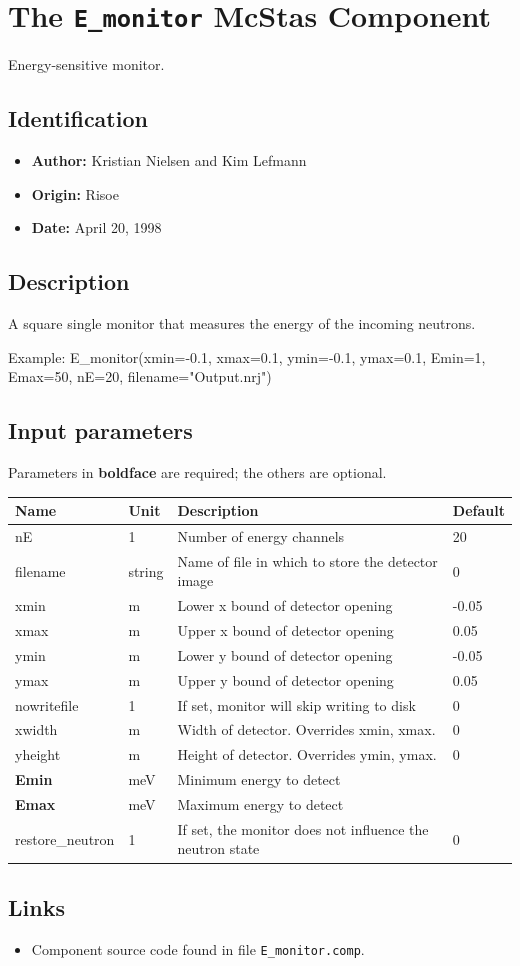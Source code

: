 \section{The \texttt{E\_monitor} McStas Component}
Energy-sensitive monitor.

\subsection*{Identification}
\begin{itemize}
  \item \textbf{Author:} Kristian Nielsen and Kim Lefmann
  \item \textbf{Origin:} Risoe
  \item \textbf{Date:} April 20, 1998
\end{itemize}

\subsection*{Description}
A square single monitor that measures the energy of the incoming neutrons.

Example: E\_monitor(xmin=-0.1, xmax=0.1, ymin=-0.1, ymax=0.1, Emin=1, Emax=50, nE=20, filename="Output.nrj")

\subsection*{Input parameters}
Parameters in \textbf{boldface} are required; the others are optional.

\begin{longtable}{p{}p{}p{}p{}}
\toprule
\textbf{Name} & \textbf{Unit} & \textbf{Description} & \textbf{Default} \\
\midrule
\endhead
nE & 1 & Number of energy channels & 20 \\
filename & string & Name of file in which to store the detector image & 0 \\
xmin & m & Lower x bound of detector opening & -0.05 \\
xmax & m & Upper x bound of detector opening & 0.05 \\
ymin & m & Lower y bound of detector opening & -0.05 \\
ymax & m & Upper y bound of detector opening & 0.05 \\
nowritefile & 1 & If set, monitor will skip writing to disk & 0 \\
xwidth & m & Width of detector. Overrides xmin, xmax. & 0 \\
yheight & m & Height of detector. Overrides ymin, ymax. & 0 \\
\textbf{Emin} & meV & Minimum energy to detect &  \\
\textbf{Emax} & meV & Maximum energy to detect &  \\
restore\_neutron & 1 & If set, the monitor does not influence the neutron state & 0 \\
\bottomrule
\end{longtable}

\subsection*{Links}
\begin{itemize}
  \item Component source code found in file \texttt{E\_monitor.comp}.
\end{itemize}
